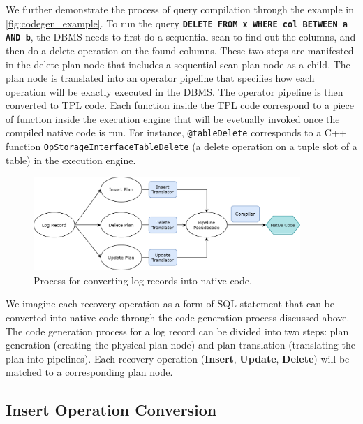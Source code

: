 \documentclass[12pt]{cmuthesis}
\newcommand{\dbSQL}[1]{\texttt{\textbf{#1}}\xspace}
\begin{document}
We further demonstrate the process of query compilation through the example in \ref{fig:codegen_example}. To run the query \dbSQL{DELETE FROM x WHERE col BETWEEN a AND b}, the DBMS needs to first do a sequential scan to find out the columns, and then do a delete operation on the found columns. These two steps are manifested in the delete plan node that includes a sequential scan plan node as a child. The plan node is translated into an operator pipeline that specifies how each operation will be exactly executed in the DBMS. The operator pipeline is then converted to TPL code. Each function inside the TPL code correspond to a piece of function inside the execution engine that will be evetually invoked once the compiled native code is run. For instance, \texttt{@tableDelete} corresponds to a C++ function \texttt{OpStorageInterfaceTableDelete} (a delete operation on a tuple slot of a table) in the execution engine.

\begin{figure}[H]
\centering
\includegraphics[width=0.9\textwidth]{images/ExpressionGeneration.png}
\caption{Process for converting log records into native code.}
\label{fig:logging}
\end{figure}
We imagine each recovery operation as a form of SQL statement that can be converted into native code through the code generation process discussed above. The code generation process for a log record can be divided into two steps: plan generation (creating the physical plan node) and plan translation (translating the plan into pipelines). Each recovery operation (\textbf{Insert}, \textbf{Update}, \textbf{Delete}) will be matched to a corresponding plan node.

\subsection{Insert Operation Conversion}
\end{document}
